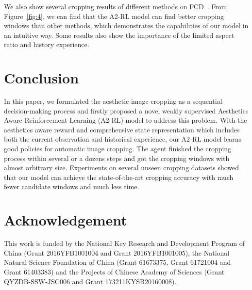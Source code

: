 \documentclass[10pt,twocolumn,letterpaper]{article}
\begin{document}
We also show several cropping results of different methods on FCD~\cite{chen2017quantitative}. From Figure~\ref{fig:4}, we can find that the A2-RL model can find better cropping windows than other methods, which demonstrates the capabilities of our model in an intuitive way. Some results also show the importance of the limited aspect ratio and history experience.
\section{Conclusion}
In this paper, we formulated the aesthetic image cropping as a sequential decision-making process and firstly proposed a novel weakly supervised Aesthetics Aware Reinforcement Learning (A2-RL) model to address this problem. With the aesthetics aware reward and comprehensive state representation which includes both the current observation and historical experience, our A2-RL model learns good policies for automatic image cropping. The agent finished the cropping process within several or a dozens steps and got the cropping windows with almost arbitrary size. Experiments on several unseen cropping datasets showed that our model can achieve the state-of-the-art cropping accuracy with much fewer candidate windows and much less time.
\section*{Acknowledgement}
This work is funded by the National Key Research and Development Program of China (Grant 2016YFB1001004 and Grant 2016YFB1001005), the National Natural Science Foundation of China (Grant 61673375, Grant 61721004 and Grant 61403383) and the Projects of Chinese Academy of Sciences (Grant QYZDB-SSW-JSC006 and Grant 173211KYSB20160008).

{\small


}
\end{document}

